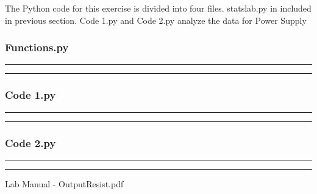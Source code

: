 \documentclass[letterpaper,12pt]{article}
\begin{document}
The Python code for this exercise is divided into four files. statslab.py in included in previous section. Code 1.py and Code 2.py
analyze the data for Power Supply

\subsubsection{Functions.py}
\noindent\rule{\textwidth}{1pt}

\noindent\rule{\textwidth}{1pt}

\pagebreak

\subsubsection{Code 1.py}
\noindent\rule{\textwidth}{1pt}

\noindent\rule{\textwidth}{1pt}

\pagebreak

\subsubsection{Code 2.py}
\noindent\rule{\textwidth}{1pt}

\noindent\rule{\textwidth}{1pt}

\pagebreak

\begin{thebibliography}{99}

 Lab Manual - OutputResist.pdf

\end{thebibliography}
\end{document}
